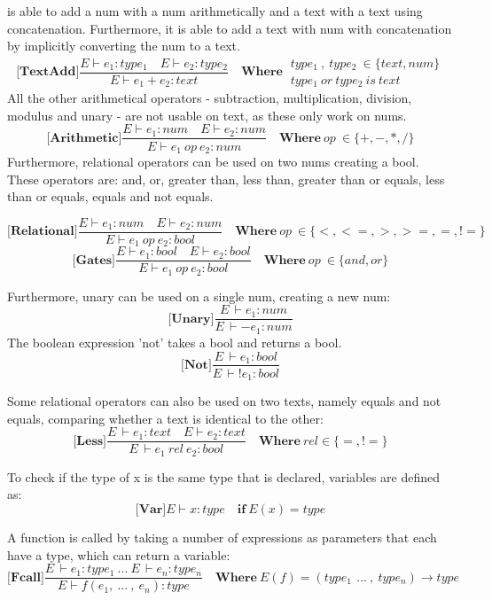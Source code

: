 \lang{} is able to add a num with a num arithmetically and a text with a text using concatenation. Furthermore, it is able to add a text with num with concatenation by implicitly converting the num to a text.\\
\[ \textbf{[TextAdd]} \frac{E \vdash e_1 : type_1 \quad E \vdash e_2 : type_2}{E \vdash e_1 + e_2 : text}\quad \textbf{Where}\: \begin{aligned} type_1\: ,\ type_2\: \in \{text, num\} \\   type_1\ or\ type_2\ is\ text \end{aligned}\]
All the other arithmetical operators - subtraction, multiplication, division, modulus and unary - are not usable on text, as these only work on nums.
\[ \textbf{[Arithmetic]} \frac{E \vdash e_1 : num \quad E \vdash e_2 : num}{E \vdash e_1\ op\ e_2 : num}\quad \textbf{Where}\: op\: \in \{+,-,*,/\}\]
Furthermore, relational operators can be used on two nums creating a bool. These operators are: and, or, greater than, less than, greater than or equals, less than or equals, equals and not equals.

\[ \textbf{[Relational]} \frac{E \vdash e_1 : num \quad E \vdash e_2 : num}{E \vdash e_1\: op\: e_2 : bool}\quad \textbf{Where}\: op\: \in \{<,<=,>,>=,=,!=\}\]
\[ \textbf{[Gates]} \frac{E \vdash e_1 : bool \quad E \vdash e_2 : bool}{E \vdash e_1\: op\: e_2 : bool}\quad \textbf{Where}\: op\: \in \{and,or\}\]

Furthermore, unary can be used on a single num, creating a new num:
\[ \textbf{[Unary]} \frac{E\, \vdash e_1 : num }{E\, \vdash -e_1 : num}\]
The boolean expression 'not' takes a bool and returns a bool.
\[ \textbf{[Not]} \frac{E\, \vdash e_1 : bool }{E\, \vdash !e_1 : bool}\]

Some relational operators can also be used on two texts, namely equals and not equals, comparing whether a text is identical to the other: 
\[ \textbf{[Less]}\frac{E\, \vdash e_1 : text \quad E \vdash e_2 : text}{E\, \vdash e_1\ rel\ e_2 : bool}\quad \textbf{Where}\ rel \in \{=,!= \}\]

To check if the type of x is the same type that is declared, variables are defined as:
\[ \textbf{[Var]}E \vdash x : type\quad \textbf{if}\ E(x)  = type\]

A function is called by taking a number of expressions as parameters that each have a type, which can return a variable:
\[ \textbf{[Fcall]}\frac{E\, \vdash e_1:type_1\ ...\ E\, \vdash e_n:type_n}{E\vdash f(e_1,\ ...\ ,\ e_n):type}\quad \textbf{Where}\ E(f)=(type_1\: \, ...\: ,\ type_n)\rightarrow type\]

